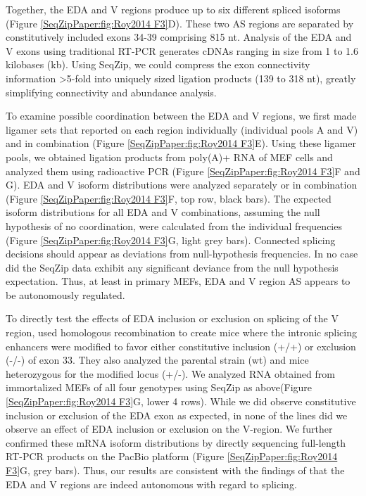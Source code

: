 		Together, the EDA and V regions produce up to six different spliced isoforms (Figure \ref{SeqZipPaper:fig:Roy2014 F3}D). These two AS regions are separated by constitutively included exons 34-39 comprising 815 nt. Analysis of the EDA and V exons using traditional RT-PCR generates cDNAs ranging in size from 1 to 1.6 kilobases (kb). Using SeqZip, we could compress the exon connectivity information >5-fold into uniquely sized ligation products (139 to 318 nt), greatly simplifying connectivity and abundance analysis.

		To examine possible coordination between the EDA and V regions, we first made ligamer sets that reported on each region individually (individual pools A and V) and in combination (Figure \ref{SeqZipPaper:fig:Roy2014 F3}E). Using these ligamer pools, we obtained ligation products from poly(A)+ RNA of MEF cells and analyzed them using radioactive PCR (Figure \ref{SeqZipPaper:fig:Roy2014 F3}F and G). EDA and V isoform distributions were analyzed separately or in combination (Figure \ref{SeqZipPaper:fig:Roy2014 F3}F, top row, black bars). The expected isoform distributions for all EDA and V combinations, assuming the null hypothesis of no coordination, were calculated from the individual frequencies (Figure \ref{SeqZipPaper:fig:Roy2014 F3}G, light grey bars). Connected splicing decisions should appear as deviations from null-hypothesis frequencies. In no case did the SeqZip data exhibit any significant deviance from the null hypothesis expectation. Thus, at least in primary MEFs, EDA and V region AS appears to be autonomously regulated.

		To directly test the effects of EDA inclusion or exclusion on splicing of the V region, \citet{Chauhan2004} used homologous recombination to create mice where the intronic splicing enhancers were modified to favor either constitutive inclusion (+/+) or exclusion (-/-) of exon 33. They also analyzed the parental strain (wt) and mice heterozygous for the modified locus (+/-). We analyzed RNA obtained from immortalized MEFs of all four genotypes using SeqZip as above(Figure \ref{SeqZipPaper:fig:Roy2014 F3}G, lower 4 rows). While we did observe constitutive inclusion or exclusion of the EDA exon as expected, in none of the lines did we observe an effect of EDA inclusion or exclusion on the V-region. We further confirmed these mRNA isoform distributions by directly sequencing full-length RT-PCR products on the PacBio platform (Figure \ref{SeqZipPaper:fig:Roy2014 F3}G, grey bars). Thus, our results are consistent with the findings of \citet{Chauhan2004} that the EDA and V regions are indeed autonomous with regard to splicing.

